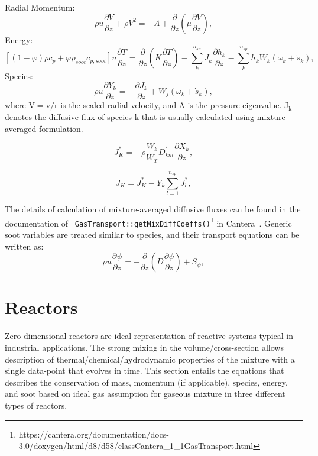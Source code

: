 \noindent Radial Momentum:
\begin{equation}
	\rho u\frac{\partial V}{\partial z} + \rho V^2=-\Lambda +
	\frac{\partial}{\partial z}
	\left(
		\mu \frac{\partial V}{\partial z}
	\right)
	\label{eqn:flame_momen},
\end{equation}
\noindent Energy:
\begin{equation}
	\left[
		(1-\varphi)\rho c_p
		+\varphi\rho_{soot} c_{p,soot}
	\right] u
	\frac{\partial T}{\partial z} = 	\frac{\partial}{\partial z}
	\left(
	K \frac{\partial T}{\partial z}
	\right)
	-\sum_{k}^{n_{sp}} J_k \frac{\partial h_k}{\partial z}
	-\sum_{k}^{n_{sp}} h_k W_k
	\left(
		\omega_k+\dot{s}_k
	\right)
	\label{eqn:flame_energy},
\end{equation}
\noindent Species:
\begin{equation}
	\rho u\frac{\partial Y_k}{\partial z} = 
	-\frac{\partial J_k}{\partial z}
	+ W_j 
	\left(
	\omega_k+\dot{s}_k
	\right)
	\label{eqn:flame_species},
\end{equation}
\noindent where $\mathrm{V=v/r}$ is the scaled radial velocity, and $\mathrm{\Lambda}$ is the pressure eigenvalue. $\mathrm{J_k}$ denotes the diffusive flux of species $\mathrm{k}$ that is usually calculated using mixture averaged formulation.

\begin{equation}
	J^*_K = -\rho \frac{W_k}{W_T}D^{'}_{km}
	\frac{\partial X_k}{\partial z}
	\label{eqn:diffflux_star},
\end{equation}

\begin{equation}
	J_K = J^*_K - Y_k \sum_{l=1}^{n_{sp}} J^*_l
	\label{eqn:diffflux},
\end{equation}

The details of calculation of mixture-averaged diffusive fluxes can be found in the documentation of \verb| GasTransport::getMixDiffCoeffs()|\footnote[1]{https://cantera.org/documentation/docs-3.0/doxygen/html/d8/d58/classCantera\_1\_1GasTransport.html} in Cantera~\citep{cantera}. Generic soot variables are treated similar to species, and their transport equations can be written as:
\begin{equation}
	\rho u\frac{\partial \psi}{\partial z} = 
	-\frac{\partial}{\partial z}
	\left(
		D\frac{\partial \psi}{\partial z}
	\right)
	+ S_{\psi} 
	\label{eqn:flame_soot},
\end{equation}


\section{Reactors}
Zero-dimensional reactors are ideal representation of reactive systems typical in industrial applications. The strong mixing in the volume/cross-section allows description of thermal/chemical/hydrodynamic properties of the mixture with a single data-point that evolves in time. This section entails the equations that describes the conservation of mass, momentum (if applicable), species, energy, and soot based on ideal gas assumption for gaseous mixture in three different types of reactors.
